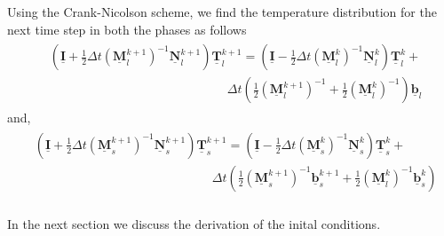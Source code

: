 Using the Crank-Nicolson scheme, we find the temperature distribution for the next time step in both the phases as follows
\begin{subequations}
    \begin{align}
        \begin{split}
            &\left(\underline{\mathbf{I}} + \frac{1}{2}\Delta t (\underline{\mathbf{M}}_l^{k+1})^{-1}\underline{\mathbf{N}}^{k+1}_l \right)\underline{\mathbf{T}}^{k+1}_l = \left(\underline{\mathbf{I}} - \frac{1}{2}\Delta t (\underline{\mathbf{M}}_l^{k})^{-1}\underline{\mathbf{N}}^{k}_l \right)\underline{\mathbf{T}}^{k}_l +\\
            &\hspace{6cm} \Delta t\left(\frac{1}{2}(\underline{\mathbf{M}}_l^{k+1})^{-1} + \frac{1}{2}(\underline{\mathbf{M}}_l^{k})^{-1} \right)\underline{\mathbf{b}}_l
        \end{split}
        \end{align}
\end{subequations}
and,
\newpage
\begin{subequations}
    \begin{align}
        \begin{split}
            & \left(\underline{\mathbf{I}} + \frac{1}{2}\Delta t (\underline{\mathbf{M}}_s^{k+1})^{-1}\underline{\mathbf{N}}^{k+1}_s \right)\underline{\mathbf{T}}^{k+1}_s = \left(\underline{\mathbf{I}} - \frac{1}{2}\Delta t (\underline{\mathbf{M}}_s^{k})^{-1}\underline{\mathbf{N}}^{k}_s \right)\underline{\mathbf{T}}^{k}_s +\\
            & \hspace{6cm} \Delta t\left(\frac{1}{2}(\underline{\mathbf{M}}_s^{k+1})^{-1}\underline{\mathbf{b}}_s^{k+1} + \frac{1}{2}(\underline{\mathbf{M}}_l^{k})^{-1}\underline{\mathbf{b}}_s^k \right)\\
        \end{split}
    \end{align}
\end{subequations}

In the next section we discuss the derivation of the inital conditions.


